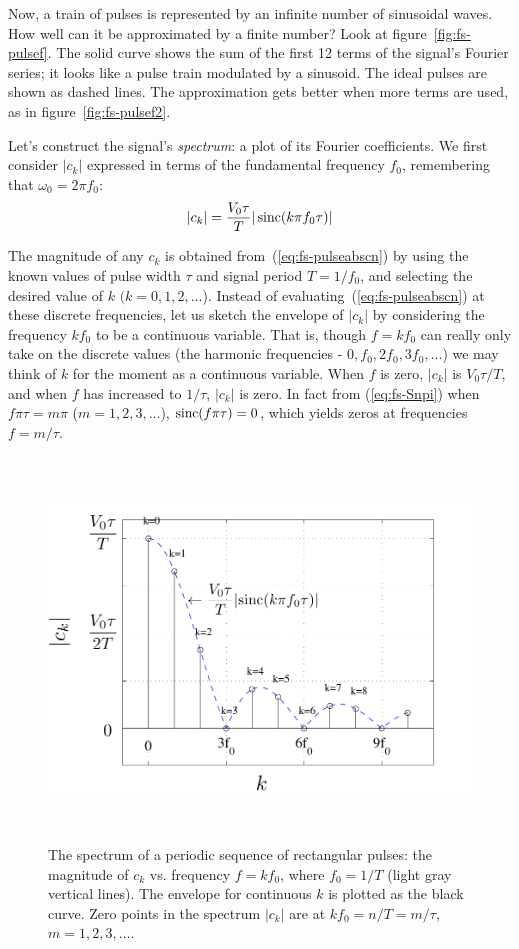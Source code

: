 Now, a train of pulses is represented by an infinite number of
sinusoidal waves. How well can it be approximated by a finite number?
Look at figure~\ref{fig:fs-pulsef}. The solid curve shows the sum of
the first 12 terms of the signal's Fourier series; it looks like a
pulse train modulated by a sinusoid. The ideal pulses are shown as
dashed lines. The approximation gets better when more terms are used,
as in figure~\ref{fig:fs-pulsef2}.

Let's construct the signal's \emph{spectrum}: a plot of its Fourier
coefficients. We first consider $|c_k|$ expressed in terms of the
fundamental frequency $f_0$, remembering that $\omega_0=2\pi f_0$:
\begin{equation}
|c_k|=\frac{V_0\tau}{T}|\operatorname{sinc}(k\pi f_0 \tau)|
\label{eq:fs-pulseabscn}
\end{equation} 

The magnitude of any $c_k$ is obtained from~(\ref{eq:fs-pulseabscn})
by using the known values of pulse width $\tau$ and signal period
$T=1/f_0$, and selecting the desired value of $k$ $(k=0, 1, 2,
\ldots$). Instead of evaluating~(\ref{eq:fs-pulseabscn}) at these
discrete frequencies, let us sketch the envelope of $|c_k|$ by
considering the frequency $kf_0$ to be a continuous variable. That is,
though $f=kf_0$ can really only take on the discrete values (the
harmonic frequencies - $0, f_0, 2f_0, 3f_0, \ldots$) we may think
of $k$ for the moment as a continuous variable. When $f$ is zero,
$|c_k|$ is $V_0\tau/T$, and when $f$ has increased to
$1/\tau$, $|c_k|$ is zero.  In fact from (\ref{eq:fs-Snpi}) when
$f\pi\tau = m\pi$ ($m=1,2,3,\ldots$), $\operatorname{sinc}(f\pi\tau)=0$, which
yields zeros at frequencies $f = m/\tau$.

\begin{figure}
\centerline{\includegraphics[height=4in]{ch-physical/fs_pulsecn}}
\caption[Spectrum of a periodic sequence of rectangular pulses]{The
spectrum of a periodic sequence of rectangular pulses: the magnitude
of $c_k$ vs. frequency $f=kf_0$, where $f_0=1/T$ (light gray vertical
lines).  The envelope for continuous $k$ is plotted as the black
curve. Zero points in the spectrum $|c_k|$ are at $kf_0=n/T=m/\tau$,
$m=1,2,3,\ldots$.
\label{fig:fs-pulsecn}}
\end{figure}

